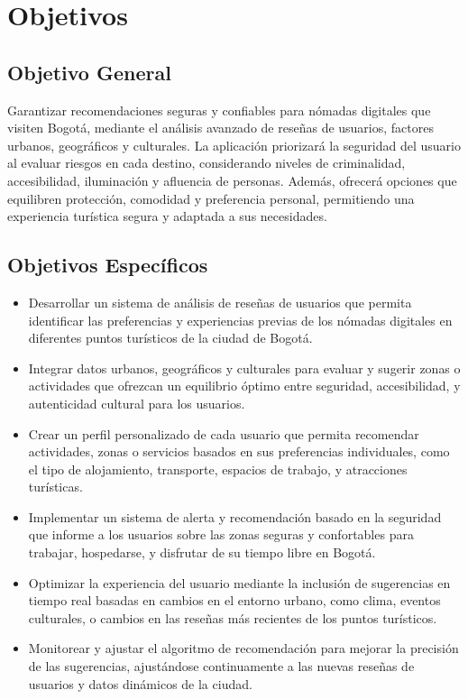 \section{Objetivos}

\subsection{Objetivo General}

Garantizar recomendaciones seguras y confiables para nómadas digitales que visiten Bogotá, mediante el análisis avanzado de reseñas de usuarios, factores urbanos, geográficos y culturales. La aplicación priorizará la seguridad del usuario al evaluar riesgos en cada destino, considerando niveles de criminalidad, accesibilidad, iluminación y afluencia de personas. Además, ofrecerá opciones que equilibren protección, comodidad y preferencia personal, permitiendo una experiencia turística segura y adaptada a sus necesidades.

\subsection{Objetivos Específicos}
\begin{itemize}
    \item  Desarrollar un sistema de análisis de reseñas de usuarios que permita identificar las preferencias y experiencias previas de los nómadas digitales en diferentes puntos turísticos de la ciudad de Bogotá. 
    \item  Integrar datos urbanos, geográficos y culturales para evaluar y sugerir zonas o actividades que ofrezcan un equilibrio óptimo entre seguridad, accesibilidad, y autenticidad cultural para los usuarios. 
    \item  Crear un perfil personalizado de cada usuario que permita recomendar actividades, zonas o servicios basados en sus preferencias individuales, como el tipo de alojamiento, transporte, espacios de trabajo, y atracciones turísticas.
    \item Implementar un sistema de alerta y recomendación basado en la seguridad que informe a los usuarios sobre las zonas seguras y confortables para trabajar, hospedarse, y disfrutar de su tiempo libre en Bogotá. 
    \item Optimizar la experiencia del usuario mediante la inclusión de sugerencias en tiempo real basadas en cambios en el entorno urbano, como clima, eventos culturales, o cambios en las reseñas más recientes de los puntos turísticos. 
    \item Monitorear y ajustar el algoritmo de recomendación para mejorar la precisión de las sugerencias, ajustándose continuamente a las nuevas reseñas de usuarios y datos dinámicos de la ciudad.

\end{itemize}